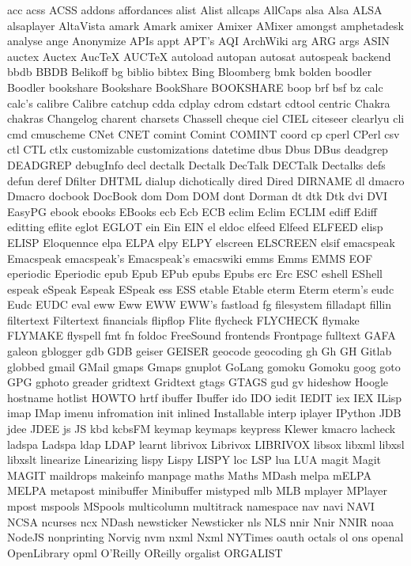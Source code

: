 acc
acss
ACSS
addons
affordances
alist
Alist
allcaps
AllCaps
alsa
Alsa
ALSA
alsaplayer
AltaVista
amark
Amark
amixer
Amixer
AMixer
amongst
amphetadesk
analyse
ange
Anonymize
APIs
appt
APT's
AQI
ArchWiki
arg
ARG
args
ASIN
auctex
Auctex
AucTeX
AUCTeX
autoload
autopan
autosat
autospeak
backend
bbdb
BBDB
Belikoff
bg
biblio
bibtex
Bing
Bloomberg
bmk
bolden
boodler
Boodler
bookshare
Bookshare
BookShare
BOOKSHARE
boop
brf
bsf
bz
calc
calc's
calibre
Calibre
catchup
cdda
cdplay
cdrom
cdstart
cdtool
centric
Chakra
chakras
Changelog
charent
charsets
Chassell
cheque
ciel
CIEL
citeseer
clearlyu
cli
cmd
cmuscheme
CNet
CNET
comint
Comint
COMINT
coord
cp
cperl
CPerl
csv
ctl
CTL
ctlx
customizable
customizations
datetime
dbus
Dbus
DBus
deadgrep
DEADGREP
debugInfo
decl
dectalk
Dectalk
DecTalk
DECTalk
Dectalks
defs
defun
deref
Dfilter
DHTML
dialup
dichotically
dired
Dired
DIRNAME
dl
dmacro
Dmacro
docbook
DocBook
dom
Dom
DOM
dont
Dorman
dt
dtk
Dtk
dvi
DVI
EasyPG
ebook
ebooks
EBooks
ecb
Ecb
ECB
eclim
Eclim
ECLIM
ediff
Ediff
editting
eflite
eglot
EGLOT
ein
Ein
EIN
el
eldoc
elfeed
Elfeed
ELFEED
elisp
ELISP
Eloquennce
elpa
ELPA
elpy
ELPY
elscreen
ELSCREEN
elsif
emacspeak
Emacspeak
emacspeak's
Emacspeak's
emacswiki
emms
Emms
EMMS
EOF
eperiodic
Eperiodic
epub
Epub
EPub
epubs
Epubs
erc
Erc
ESC
eshell
EShell
espeak
eSpeak
Espeak
ESpeak
ess
ESS
etable
Etable
eterm
Eterm
eterm's
eudc
Eudc
EUDC
eval
eww
Eww
EWW
EWW's
fastload
fg
filesystem
filladapt
fillin
filtertext
Filtertext
financials
flipflop
Flite
flycheck
FLYCHECK
flymake
FLYMAKE
flyspell
fmt
fn
foldoc
FreeSound
frontends
Frontpage
fulltext
GAFA
galeon
gblogger
gdb
GDB
geiser
GEISER
geocode
geocoding
gh
Gh
GH
Gitlab
globbed
gmail
GMail
gmaps
Gmaps
gnuplot
GoLang
gomoku
Gomoku
goog
goto
GPG
gphoto
greader
gridtext
Gridtext
gtags
GTAGS
gud
gv
hideshow
Hoogle
hostname
hotlist
HOWTO
hrtf
ibuffer
Ibuffer
ido
IDO
iedit
IEDIT
iex
IEX
ILisp
imap
IMap
imenu
infromation
init
inlined
Installable
interp
iplayer
IPython
JDB
jdee
JDEE
js
JS
kbd
kcbsFM
keymap
keymaps
keypress
Klewer
kmacro
lacheck
ladspa
Ladspa
ldap
LDAP
learnt
librivox
Librivox
LIBRIVOX
libsox
libxml
libxsl
libxslt
linearize
Linearizing
lispy
Lispy
LISPY
loc
LSP
lua
LUA
magit
Magit
MAGIT
maildrops
makeinfo
manpage
maths
Maths
MDash
melpa
mELPA
MELPA
metapost
minibuffer
Minibuffer
mistyped
mlb
MLB
mplayer
MPlayer
mpost
mspools
MSpools
multicolumn
multitrack
namespace
nav
navi
NAVI
NCSA
ncurses
ncx
NDash
newsticker
Newsticker
nls
NLS
nnir
Nnir
NNIR
noaa
NodeJS
nonprinting
Norvig
nvm
nxml
Nxml
NYTimes
oauth
octals
ol
ons
openal
OpenLibrary
opml
O'Reilly
OReilly
orgalist
ORGALIST
